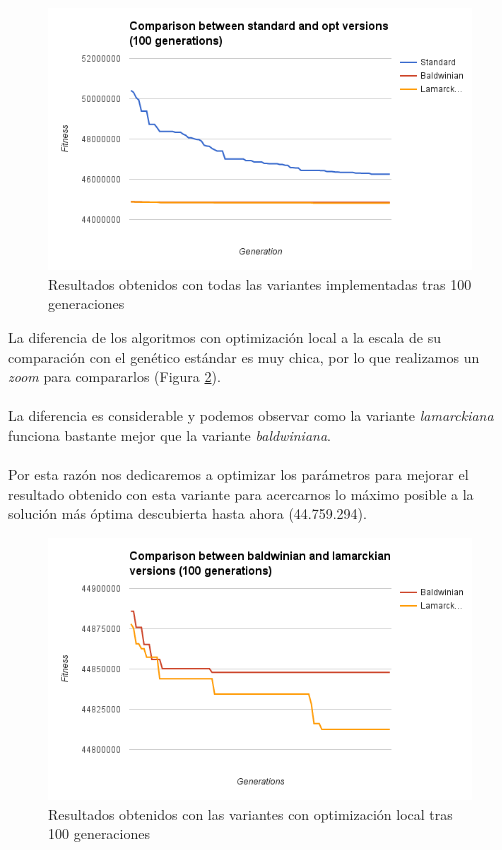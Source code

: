 \begin{figure}[H]
	\centering
	\includegraphics[width=14cm]{img/comparing-standard-with-opt}
	\caption{Resultados obtenidos con todas las variantes implementadas tras 100 generaciones}
	\label{fig:comparing-standard-with-opt}
\end{figure}

La diferencia de los algoritmos con optimización local a la escala de su comparación con el genético estándar es muy chica, por lo que realizamos un \textit{zoom} para compararlos (Figura \ref{fig:comparing-opt}).
\\ \\
La diferencia es considerable y podemos observar como la variante \textit{lamarckiana} funciona bastante mejor que la variante \textit{baldwiniana}.
\\ \\
Por esta razón nos dedicaremos a optimizar los parámetros para mejorar el resultado obtenido con esta variante para acercarnos lo máximo posible a la solución más óptima descubierta hasta ahora (44.759.294).

\begin{figure}[H]
	\centering
	\includegraphics[width=14cm]{img/comparing-opt}
	\caption{Resultados obtenidos con las variantes con optimización local tras 100 generaciones}
	\label{fig:comparing-opt}
\end{figure}

